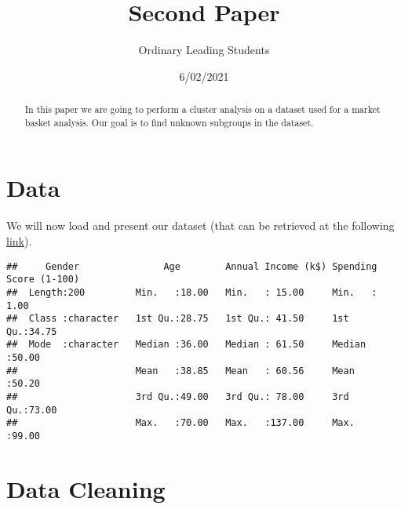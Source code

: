 \documentclass[
]{article}
\title{Second Paper}
\author{Ordinary Leading Students}
\date{6/02/2021}
\newenvironment{Shaded}{\begin{snugshade}}{\end{snugshade}}
\newcommand{\CommentTok}[1]{\textcolor[rgb]{0.56,0.35,0.01}{\textit{#1}}}
\newcommand{\DecValTok}[1]{\textcolor[rgb]{0.00,0.00,0.81}{#1}}
\newcommand{\FunctionTok}[1]{\textcolor[rgb]{0.00,0.00,0.00}{#1}}
\newcommand{\NormalTok}[1]{#1}
\newcommand{\OtherTok}[1]{\textcolor[rgb]{0.56,0.35,0.01}{#1}}
\newcommand{\SpecialCharTok}[1]{\textcolor[rgb]{0.00,0.00,0.00}{#1}}
\newcommand{\StringTok}[1]{\textcolor[rgb]{0.31,0.60,0.02}{#1}}
\begin{document}
\maketitle

\begin{abstract}
In this paper we are going to perform a cluster analysis on a dataset used for a 
market basket analysis. Our goal is to find unknown subgroups in the dataset.

\end{abstract}

\section{Data}

We will now load and present our dataset (that can be retrieved at the
following
\href{https://www.kaggle.com/vjchoudhary7/customer-segmentation-tutorial-in-python}{link}).

\begin{Shaded}
\end{Shaded}

\begin{verbatim}
##     Gender               Age        Annual Income (k$) Spending Score (1-100)
##  Length:200         Min.   :18.00   Min.   : 15.00     Min.   : 1.00         
##  Class :character   1st Qu.:28.75   1st Qu.: 41.50     1st Qu.:34.75         
##  Mode  :character   Median :36.00   Median : 61.50     Median :50.00         
##                     Mean   :38.85   Mean   : 60.56     Mean   :50.20         
##                     3rd Qu.:49.00   3rd Qu.: 78.00     3rd Qu.:73.00         
##                     Max.   :70.00   Max.   :137.00     Max.   :99.00
\end{verbatim}

\section{Data Cleaning}
\end{document}

